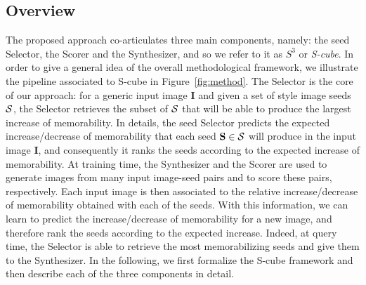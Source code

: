 \documentclass{sig-alternate-05-2015}
\begin{document}
\subsection{Overview}
The proposed approach co-articulates three main components, namely: the seed Selector, the Scorer and the Synthesizer, and so we refer to it as $S^3$ or \emph{S-cube}. In order to give a general idea of the overall methodological framework, we illustrate the pipeline associated to S-cube in Figure~\ref{fig:method}. The {Selector} is the core of our approach: for a generic input image $\textbf{I}$ and given a set of style image seeds ${\cal S}$, the Selector retrieves the subset of ${\cal S}$ that will be able to produce the largest increase of memorability. In details, the seed Selector predicts the expected increase/decrease of memorability that each seed $\mathbf{S}\in{\cal S}$ will produce in the input image $\mathbf{I}$, and consequently it ranks the seeds according to the expected increase of memorability. At training time, the Synthesizer and the Scorer are used to generate images from many input image-seed pairs and to score these pairs, respectively. Each input image is then associated to the relative increase/decrease of memorability obtained with each of the seeds. With this information, we can learn to predict the increase/decrease of memorability for a new image, and therefore rank the seeds according to the expected increase. Indeed, at query time, the Selector is able to retrieve the most memorabilizing seeds and give them to the Synthesizer. In the following, we first formalize the S-cube framework and then describe each of the three components in detail.

\end{document}
